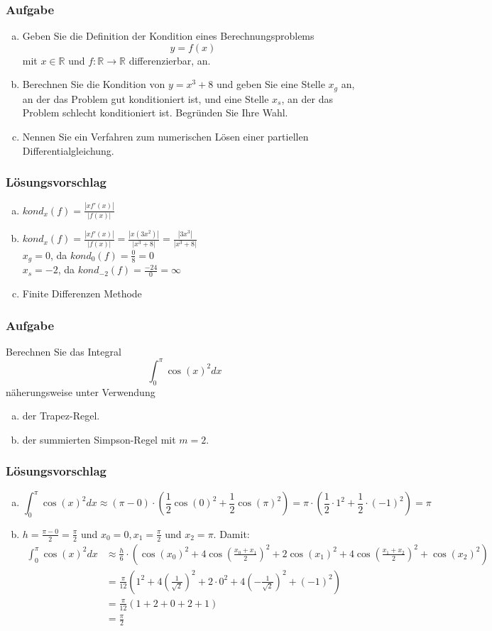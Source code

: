 \documentclass[a4paper,11pt]{scrartcl}
\newcounter{auf}
\newcommand{\Aufgabe}%
        {\addtocounter{auf}{1} \subsubsection*{\rmfamily  Aufgabe \theauf \hspace{1em}} }
\newcommand{\RR}{\mathbb{R}}
\begin{document}
\Aufgabe

\begin{enumerate}[a)]

\item Geben Sie die Definition der Kondition eines Berechnungsproblems 
$$
	y=f(x)
$$
mit $x \in \RR$ und $f:\RR \to \RR$ differenzierbar, an.
\item  Berechnen Sie die Kondition von $y=x^3+8$ und geben Sie eine Stelle $x_g$ an, an der das Problem gut konditioniert ist, und eine Stelle $x_s$, an der das Problem schlecht konditioniert ist. Begründen Sie Ihre Wahl.
\item Nennen Sie ein Verfahren zum numerischen Lösen einer partiellen Differentialgleichung.
\end{enumerate}
%
%
\subsubsection*{Lösungsvorschlag}
\begin{enumerate}[a)]
\item $kond_x(f)=\frac{|xf'(x)|}{|f(x)|}$
\item $kond_x(f)=\frac{|xf'(x)|}{|f(x)|}=\frac{|x(3x^2)|}{|x^3+8|}=\frac{|3x^3|}{|x^3+8|}$\\
$x_g=0$, da $kond_0(f)=\frac{0}{8}=0$\\
$x_s=-2$, da $kond_{-2}(f)=\frac{-24}{0}=\infty$
\item Finite Differenzen Methode
\end{enumerate}
\newpage
\Aufgabe
Berechnen Sie das Integral
$$
\int_0^\pi \cos(x)^2 dx
$$
näherungsweise unter Verwendung
\begin{enumerate}[a)]
\item der Trapez-Regel.
\item der summierten Simpson-Regel mit $m=2$.
\end{enumerate}
%
%
\subsubsection*{Lösungsvorschlag}
\begin{enumerate}[a)]
\item
$$
\int_0^\pi \cos(x)^2 dx \approx (\pi-0)\cdot(\frac{1}{2} \cos(0)^2+\frac{1}{2}\cos(\pi)^2)=\pi\cdot (\frac{1}{2}\cdot 1^2+\frac{1}{2}\cdot(-1)^2)=\pi
$$
\item $h=\frac{\pi -0 }{2}=\frac{\pi}{2}$ und $x_0=0, x_1=\frac{\pi}{2}$ und $x_2=\pi$. Damit:
\begin{align*}
\int_0^\pi \cos(x)^2 dx &\approx \frac{h}{6}\cdot \left(\cos(x_0)^2+4\cos(\frac{x_0+x_1}{2})^2+2\cos(x_1)^2+4\cos(\frac{x_1+x_2}{2})^2+\cos(x_2)^2\right)\\
&=\frac{\pi}{12}\left(1^2+4(\frac{1}{\sqrt{2}})^2  +2\cdot 0^2+4(-\frac{1}{\sqrt{2}})^2+(-1)^2 \right)\\
&=\frac{\pi}{12}(1+2+0+2+1)\\
&=\frac{\pi}{2}
\end{align*}
\end{enumerate}
\end{document}
